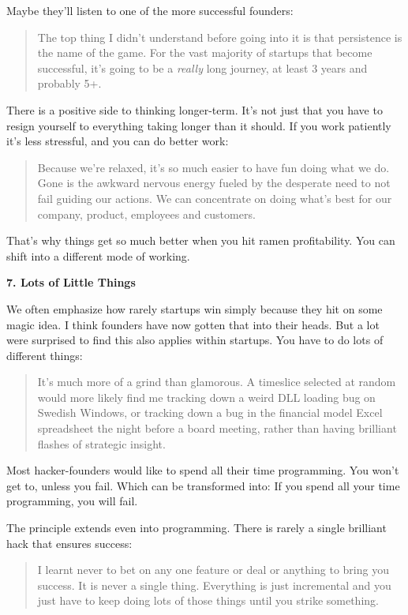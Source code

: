 \documentclass[12pt]{book}
\begin{document}
Maybe they'll listen to one of the more successful founders:

\begin{quote}
The top thing I didn't understand before going into it is that
persistence is the name of the game. For the vast majority of startups
that become successful, it's going to be a \emph{really} long journey,
at least 3 years and probably 5+.
\end{quote}

There is a positive side to thinking longer-term. It's not just that you
have to resign yourself to everything taking longer than it should. If
you work patiently it's less stressful, and you can do better work:

\begin{quote}
Because we're relaxed, it's so much easier to have fun doing what we do.
Gone is the awkward nervous energy fueled by the desperate need to not
fail guiding our actions. We can concentrate on doing what's best for
our company, product, employees and customers.
\end{quote}

That's why things get so much better when you hit ramen profitability.
You can shift into a different mode of working.

\textbf{7. Lots of Little Things}

We often emphasize how rarely startups win simply because they hit on
some magic idea. I think founders have now gotten that into their heads.
But a lot were surprised to find this also applies within startups. You
have to do lots of different things:

\begin{quote}
It's much more of a grind than glamorous. A timeslice selected at random
would more likely find me tracking down a weird DLL loading bug on
Swedish Windows, or tracking down a bug in the financial model Excel
spreadsheet the night before a board meeting, rather than having
brilliant flashes of strategic insight.
\end{quote}

Most hacker-founders would like to spend all their time programming. You
won't get to, unless you fail. Which can be transformed into: If you
spend all your time programming, you will fail.

The principle extends even into programming. There is rarely a single
brilliant hack that ensures success:

\begin{quote}
I learnt never to bet on any one feature or deal or anything to bring
you success. It is never a single thing. Everything is just incremental
and you just have to keep doing lots of those things until you strike
something.
\end{quote}
\end{document}
